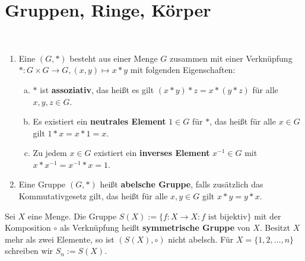 \section{Gruppen, Ringe, Körper}
\begin{definition}[Gruppe]
	\label{def:I.4.1}
	\mbox{} \\[-1.4cm]
	\begin{enumerate}[(1)]
		\item Eine  $(G,*)$ besteht aus einer Menge $G$ zusammen mit einer Verknüpfung $*\colon G \times G \rightarrow G, (x,y) \mapsto x*y$ mit folgenden Eigenschaften:
		\begin{enumerate}[a)]
			\item $*$ ist \textbf{assoziativ}, das heißt es gilt $(x*y)*z = x * (y*z)$ für alle $x,y,z \in G$. 
			\item Es existiert ein \textbf{neutrales Element} $1 \in G$ für $*$, das heißt für alle $x \in G$ gilt $1 * x = x * 1 = x$. 
			\item Zu jedem $x \in G$ existiert ein \textbf{inverses Element} $x^{-1} \in G$ mit $x * x^{-1} = x^{-1} * x = 1$. 
		\end{enumerate}
		\item Eine Gruppe $(G,*)$ heißt \textbf{abelsche Gruppe}, falls zusätzlich das Kommutativgesetz gilt, das heißt für alle $x,y \in G$ gilt $x*y = y*x$. 
	\end{enumerate}
\end{definition}

\setcounter{definition}{3}
\begin{beispiel}
	\label{bsp:I.4.4}
	Sei $X$ eine Menge. Die Gruppe $S(X) := \{f \colon X \rightarrow X : f \text{ ist bijektiv}\}$ mit der Komposition $\circ$ als Verknüpfung heißt \textbf{symmetrische Gruppe} von $X$.
	Besitzt $X$ mehr als zwei Elemente, so ist $(S(X),\circ)$ nicht abelsch. Für $X = \{1,2,\dots,n\}$ schreiben wir $S_n := S(X)$. 
\end{beispiel}


